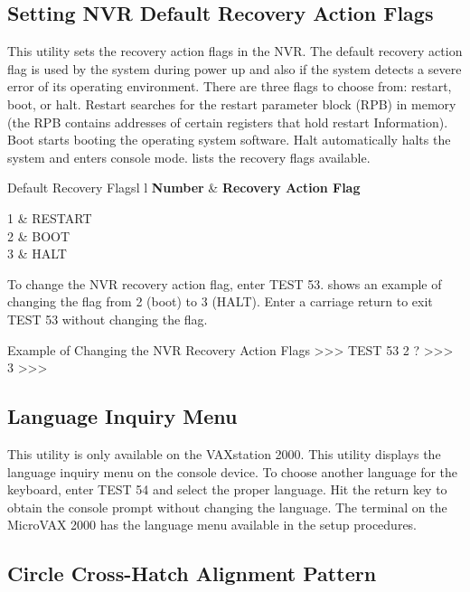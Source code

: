 \newpage

\subsection{Setting NVR Default Recovery Action Flags}

This utility sets the recovery action flags in the NVR. The default recovery
action flag is used by the system during power up and also if the system
detects a severe error of its operating environment. There are three flags to
choose from: restart, boot, or halt. Restart searches for the restart parameter
block (RPB) in memory (the RPB contains addresses of certain registers that
hold restart Information). Boot starts booting the operating system software.
Halt automatically halts the system and enters console mode. 
lists the recovery flags available.

\begin{tbl}{Default Recovery Flags}{l l}
\textbf{Number} & \textbf{Recovery Action Flag}\\
\hline

1	&	RESTART \\[0.5em]
2	&	BOOT \\[0.5em]
3	&	HALT \\[0.5em]
\end{tbl}

To change the NVR recovery action flag, enter TEST 53.  shows
an example of changing the flag from 2 (boot) to 3 (HALT). Enter a carriage
return to exit TEST 53 without changing the flag.

\begin{ttfig}{Example of Changing the NVR Recovery Action Flags}
>>> TEST 53
    2 ? >>> 3
>>>
\end{ttfig}

\subsection{Language Inquiry Menu}

This utility is only available on the VAXstation 2000. This utility displays the
language inquiry menu on the console device. To choose another language
for the keyboard, enter TEST 54 and select the proper language. Hit the
return key to obtain the console prompt without changing the language.
The terminal on the MicroVAX 2000 has the language menu available in the
setup procedures.

\newpage

\subsection{Circle Cross-Hatch Alignment Pattern}


